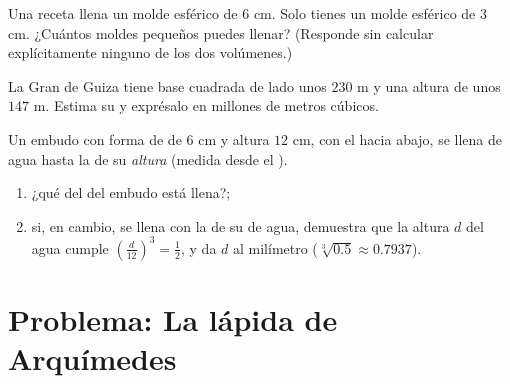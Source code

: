 \begin{exercise}[$\star\star$]\label{exo:g9:solids:7}
Una receta llena un molde esférico de  $6$ cm. Solo tienes un
molde esférico de  $3$ cm. ¿Cuántos moldes pequeños puedes llenar?
(Responde sin calcular explícitamente ninguno de los dos volúmenes.)
\end{exercise}

\begin{exercise}[$\star\star$]\label{exo:g9:solids:8}
La Gran  de Guiza tiene base cuadrada de lado unos $230$ m y una
altura de unos $147$ m. Estima su  y exprésalo en millones
de metros cúbicos.
\end{exercise}

\begin{exercise}[$\star\star\star$]\label{exo:g9:solids:9}
Un embudo con forma de  de  $6$ cm y altura $12$ cm, con el  hacia abajo, se
llena de agua hasta la  de su \emph{altura} (medida desde el
).
\begin{enumerate}
  \item ¿qué  del  del embudo está llena?;
  \item si, en cambio, se llena con la  de su \emph{} de agua,
        demuestra que la altura $d$ del agua cumple
        $\left(\frac{d}{12}\right)^3 = \frac12$, y da $d$ al
        milímetro ($\sqrt[3]{0.5} \approx 0.7937$).
\end{enumerate}
\end{exercise}

\section{Problema: La lápida de Arquímedes}

